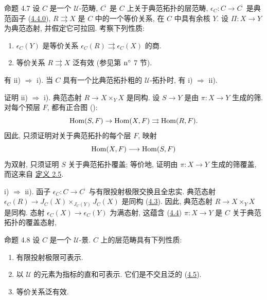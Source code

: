 \begin{enonce*}{命题 4.7}
设 $C$ 是一个 $𝒰$-范畴,
$C^{\widetilde{\phantom{,}}}$ 是 $C$ 上关于典范拓扑的层范畴,
$\epsilon_C:C\rightarrow C^{\widetilde{\phantom{,}}}$
是典范函子 (\hyperref[II.subsubsec4.4.0]{4.4.0}),
$R\rightrightarrows X$ 是 $C$ 中的一个等价关系,
在 $C$ 中具有余核 $Y$.
设 $\Pi:X\rightarrow Y$ 为典范态射, 并假定它可拉回.
考察下列性质:
\begin{enumerate}
\renewcommand{\theenumi}{\roman{enumi}}
\renewcommand{\labelenumi}{\theenumi)}
\item $\epsilon_C(Y)$ 是等价关系
$\epsilon_C(R)\rightrightarrows\epsilon_C(X)$ 的商.

\item 等价关系 $R\rightrightarrows X$ 泛有效
{\rm(参见第 ${\rm n^{\circ}}$ 7 节).}
\end{enumerate}
有 {\rm{ii) $\Rightarrow$ i).}}
当 $C$ 具有一个比典范拓扑粗的 $𝒰$-拓扑时,
有 {\rm{i) $\Rightarrow$ ii).}}
\end{enonce*}

\begin{enonce*}[remark]{证明}
ii) $\Rightarrow$ i).
典范态射 $R\rightarrow X\times_YX$ 是同构.
设 $S\rightarrow Y$ 是由 $\pi:X\rightarrow Y$ 生成的筛.
对每个预层 $F$, 都有正合图 ():
$$
\operatorname{Hom}(S,F)\rightarrow \operatorname{Hom}(X,F)\rightrightarrows \operatorname{Hom}(R,F){}.
$$
因此\pageoriginale{}, 只须证明对关于典范拓扑的每个层 $F$, 映射
$$
\operatorname{Hom}(X,F)\longrightarrow \operatorname{Hom}(S,F)
$$
为双射,
\ie 只须证明 $S$ 关于典范拓扑覆盖;
等价地, 证明由 $\pi:X\rightarrow Y$ 生成的筛覆盖,
而这来自 \hyperref[II.def2.5]{定义 2.5}.

\noindent i) $\Rightarrow$ ii).
函子 $\epsilon_C:C\rightarrow C^{\widetilde{\phantom{,}}}$
与有限投射极限交换且全忠实.
典范态射
$\epsilon_C(R)\rightarrow J_C(X)\times_{J_C(Y)}J_C(X)$
是同构 (\hyperref[II.prop4.3]{4.3}).
因此, 典范态射 $R\rightarrow X\times_YX$ 是同构.
态射 $\epsilon_C(X)\rightarrow\epsilon_C(Y)$ 为满态射,
这蕴含 (\hyperref[II.theo4.4]{4.4})
$\pi:X\rightarrow Y$ 是 $C$ 关于典范拓扑的覆盖态射, \cqfd
\end{enonce*}

\begin{enonce*}{命题 4.8}
设 $C$ 是一个 $𝒰$-景.
$C$ 上的层范畴具有下列性质:
\begin{enumerate}
\renewcommand{\theenumi}{\alph{enumi}}
\renewcommand{\labelenumi}{\theenumi)}
\item 有限投射极限可表示.

\item 以 $𝒰$ 的元素为指标的直和可表示.
它们是不交且泛的 (\hyperref[II.def4.5]{4.5}).

\item 等价关系泛有效.
\end{enumerate}
\end{enonce*}

